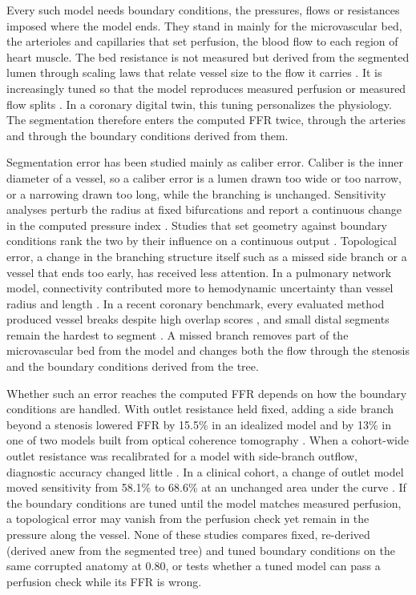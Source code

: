 \documentclass[journal,twoside,web]{ieeecolor}
\begin{document}
Every such model needs boundary conditions, the pressures, flows or resistances imposed where the model ends. They
stand in mainly for the microvascular bed, the arterioles and capillaries that set perfusion, the blood flow to each region of heart
muscle. The bed resistance is not measured but derived from the segmented lumen through
scaling laws that relate vessel size to the flow it carries \cite{murray1926,kim2010}. It is increasingly tuned so that the model reproduces measured perfusion \cite{menon2024} or measured flow splits \cite{arminio2026}. In a coronary digital twin, this tuning personalizes the physiology. The segmentation therefore enters the computed FFR twice, through the arteries and through the boundary conditions derived from them.

Segmentation error has been studied mainly as caliber error. Caliber is the inner diameter of a vessel, so a caliber error is a lumen drawn too wide or too narrow, or a narrowing drawn too long, while the branching is unchanged. Sensitivity analyses perturb the radius at fixed bifurcations and report a continuous change in the computed pressure index \cite{sankaran2015tmi,sankaran2015cmame,fernandez2024,dalmaso2025}. Studies that set geometry against
boundary conditions rank the two by their influence on a continuous output \cite{sankaran2016,tanade2022,korte2023}. Topological error, a change in the branching structure itself such as a missed side branch or a vessel that ends too early, has received less attention. In a pulmonary network model, connectivity contributed more to hemodynamic uncertainty than vessel radius and
length \cite{colebank2019}. In a recent coronary benchmark, every evaluated method produced vessel breaks despite high overlap scores \cite{bransby2026}, and small distal segments remain the hardest to segment
\cite{chen2025}. A missed branch removes part of the microvascular bed from the model and changes both the flow
through the stenosis and the boundary conditions derived from the tree.

Whether such an error reaches the computed FFR depends on how the boundary conditions are handled. With outlet resistance held fixed, adding a side branch beyond a stenosis lowered FFR by 15.5\% in an idealized model and by 13\% in one of two models built from optical coherence tomography \cite{gamage2022}. When a cohort-wide outlet resistance was recalibrated for a model with side-branch outflow, diagnostic accuracy changed little \cite{gosling2020}. In a clinical cohort, a change of outlet model moved sensitivity from 58.1\% to 68.6\% at an unchanged area under
the curve \cite{fossan2026}. If the boundary conditions are tuned until the model matches measured perfusion, a topological error may vanish
from the perfusion check yet remain in the pressure along the vessel. None of these studies compares fixed, re-derived (derived anew from the segmented tree) and tuned boundary conditions on the same corrupted anatomy at
0.80, or tests whether a tuned model can pass a perfusion check while its FFR is wrong.
\end{document}
